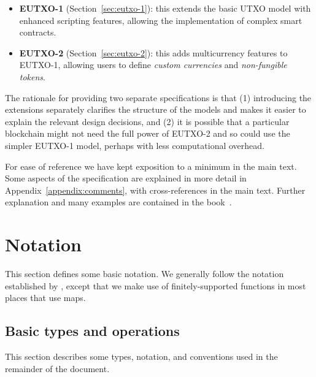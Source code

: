 \documentclass[a4paper]{article}
\begin{document}
\begin{itemize}
  \item \textbf{EUTXO-1} (Section~\ref{sec:eutxo-1}): this extends the
    basic UTXO model with enhanced scripting features, allowing the
    implementation of complex smart contracts.
  \item \textbf{EUTXO-2} (Section~\ref{sec:eutxo-2}): this adds
    multicurrency features to EUTXO-1, allowing users to define
    \textit{custom currencies} and \textit{non-fungible tokens}.
\end{itemize}


\medskip

The rationale for providing two separate specifications is that (1)
introducing the extensions separately clarifies the structure of the
models and makes it easier to explain the relevant design decisions,
and (2) it is possible that a particular blockchain might not need the
full power of EUTXO-2 and so could use the simpler EUTXO-1 model,
perhaps with less computational overhead.

\medskip

For ease of reference we have kept exposition to a minimum in the main
text.  Some aspects of the specification are explained in more detail
in Appendix~\ref{appendix:comments}, with cross-references in the main
text.  Further explanation and many examples are contained in the
book~\citep{Plutus-book}.


\section{Notation}
This section defines some basic notation.  We generally follow the
notation established by \citep{Zahnentferner18-UTxO}, except that we make use
of finitely-supported functions in most places that \citep{Zahnentferner18-UTxO}
use maps.

\subsection{Basic types and operations}
\label{sec:basic-notation}

This section describes some types, notation, and
conventions used in the remainder of the document.
\end{document}
